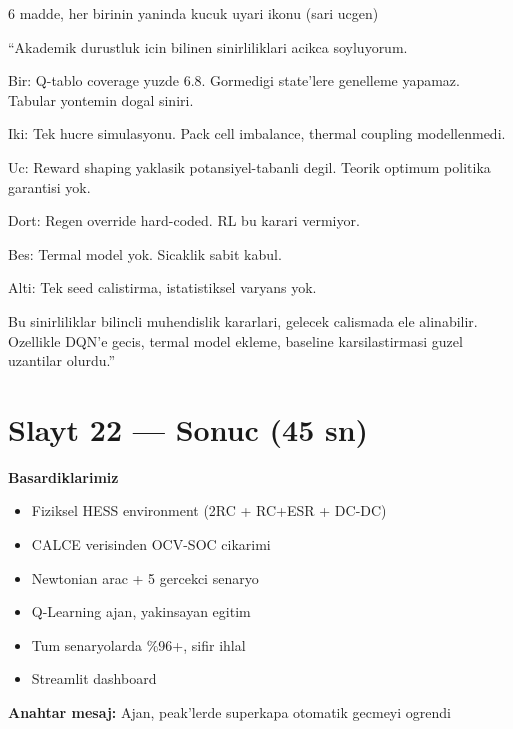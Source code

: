 \documentclass[11pt,a4paper]{article}
\begin{document}
\begin{gorselboks}
6 madde, her birinin yaninda kucuk uyari ikonu (sari ucgen)
\end{gorselboks}

\begin{sayboks}
``Akademik durustluk icin bilinen sinirliliklari acikca soyluyorum.

Bir: Q-tablo coverage yuzde 6.8. Gormedigi state'lere genelleme yapamaz. Tabular yontemin dogal siniri.

Iki: Tek hucre simulasyonu. Pack cell imbalance, thermal coupling modellenmedi.

Uc: Reward shaping yaklasik potansiyel-tabanli degil. Teorik optimum politika garantisi yok.

Dort: Regen override hard-coded. RL bu karari vermiyor.

Bes: Termal model yok. Sicaklik sabit kabul.

Alti: Tek seed calistirma, istatistiksel varyans yok.

Bu sinirliliklar bilincli muhendislik kararlari, gelecek calismada ele alinabilir. Ozellikle DQN'e gecis, termal model ekleme, baseline karsilastirmasi guzel uzantilar olurdu.''
\end{sayboks}

\section{Slayt 22 --- Sonuc (45 sn)}

\begin{slytboks}
\textbf{Basardiklarimiz}
\begin{itemize}
\item[$\checkmark$] Fiziksel HESS environment (2RC + RC+ESR + DC-DC)
\item[$\checkmark$] CALCE verisinden OCV-SOC cikarimi
\item[$\checkmark$] Newtonian arac + 5 gercekci senaryo
\item[$\checkmark$] Q-Learning ajan, yakinsayan egitim
\item[$\checkmark$] Tum senaryolarda \%96+, sifir ihlal
\item[$\checkmark$] Streamlit dashboard
\end{itemize}
\textbf{Anahtar mesaj:} Ajan, peak'lerde superkapa otomatik gecmeyi ogrendi
\end{slytboks}
\end{document}
